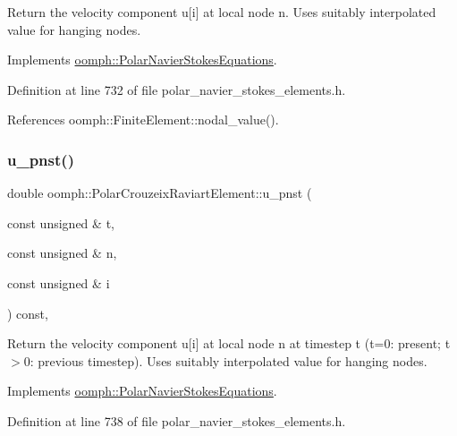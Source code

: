 Return the velocity component u\mbox{[}i\mbox{]} at local node n. Uses suitably interpolated value for hanging nodes. 



Implements \hyperlink{classoomph_1_1PolarNavierStokesEquations_ae4bfb7b4c54bf5558111f84119f530d0}{oomph\+::\+Polar\+Navier\+Stokes\+Equations}.



Definition at line 732 of file polar\+\_\+navier\+\_\+stokes\+\_\+elements.\+h.



References oomph\+::\+Finite\+Element\+::nodal\+\_\+value().

\mbox{\label{classoomph_1_1PolarCrouzeixRaviartElement_a0c61f886e4869b04ef14e4f160812985}} 
\subsubsection{\texorpdfstring{u\+\_\+pnst()}{u\_pnst()}\hspace{0.1cm}{\footnotesize\ttfamily [2/2]}}
{\footnotesize\ttfamily double oomph\+::\+Polar\+Crouzeix\+Raviart\+Element\+::u\+\_\+pnst (\begin{DoxyParamCaption}\item[{const unsigned \&}]{t,  }\item[{const unsigned \&}]{n,  }\item[{const unsigned \&}]{i }\end{DoxyParamCaption}) const\hspace{0.3cm}{\ttfamily [inline]}, {\ttfamily [virtual]}}



Return the velocity component u\mbox{[}i\mbox{]} at local node n at timestep t (t=0\+: present; t$>$0\+: previous timestep). Uses suitably interpolated value for hanging nodes. 



Implements \hyperlink{classoomph_1_1PolarNavierStokesEquations_ace9bb9807c722cd910ed54891df7d58c}{oomph\+::\+Polar\+Navier\+Stokes\+Equations}.



Definition at line 738 of file polar\+\_\+navier\+\_\+stokes\+\_\+elements.\+h.



